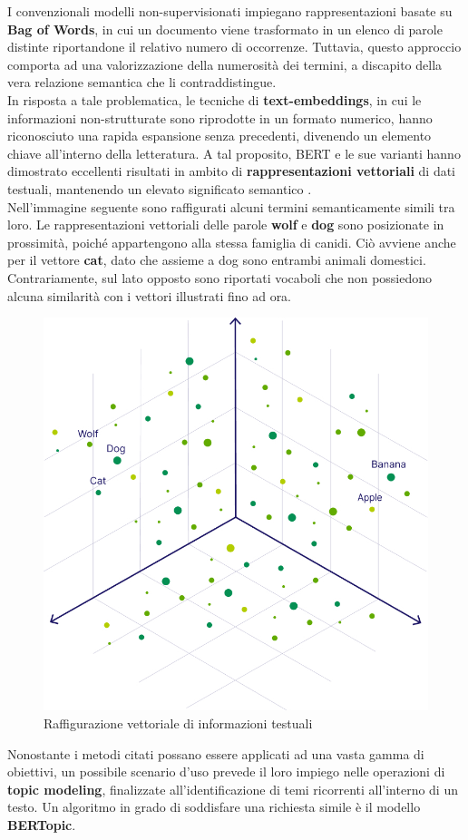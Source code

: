I convenzionali modelli non-supervisionati impiegano rappresentazioni basate su \textbf{Bag of Words}, in cui un documento viene trasformato in un elenco di parole distinte riportandone il relativo numero di occorrenze. Tuttavia, questo approccio comporta ad una valorizzazione della numerosità dei termini, a discapito della vera relazione semantica che li contraddistingue. \vspace{7pt} \\
In risposta a tale problematica, le tecniche di \textbf{text-embeddings}, in cui le informazioni non-strutturate sono riprodotte in un formato numerico, hanno riconosciuto una rapida espansione senza precedenti, divenendo un elemento chiave all'interno della letteratura. A tal proposito, BERT e le sue varianti hanno dimostrato eccellenti risultati in ambito di \textbf{rappresentazioni vettoriali} di dati testuali, mantenendo un elevato significato semantico \cite{grootendorst2022bertopic}. \vspace{7pt} \\
Nell'immagine seguente sono raffigurati alcuni termini semanticamente simili tra loro. Le rappresentazioni vettoriali delle parole \textbf{wolf} e \textbf{dog} sono posizionate in prossimità, poiché appartengono alla stessa famiglia di canidi. Ciò avviene anche per il vettore \textbf{cat}, dato che assieme a dog sono entrambi animali domestici. Contrariamente, sul lato opposto sono riportati vocaboli che non possiedono alcuna similarità con i vettori illustrati fino ad ora. 
\begin{figure}[H]
    \centering
    \includegraphics[width=.5\textwidth]{img/img3.png}
    \caption{Raffigurazione vettoriale di informazioni testuali}
\end{figure}
Nonostante i metodi citati possano essere applicati ad una vasta gamma di obiettivi, un possibile scenario d'uso prevede il loro impiego nelle operazioni di \textbf{topic modeling}, finalizzate all'identificazione di temi ricorrenti all'interno di un testo. Un algoritmo in grado di soddisfare una richiesta simile è il modello \textbf{BERTopic}. \vspace{7pt} \\
